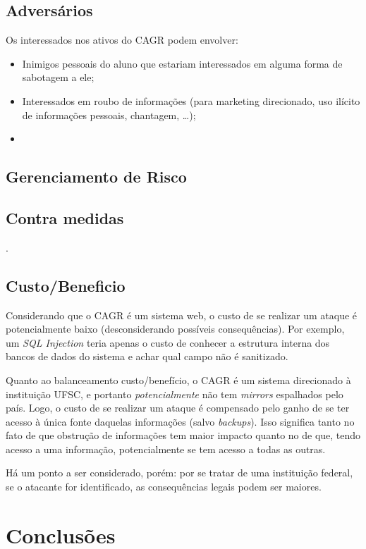 \documentclass{article}
\newcommand{\todo}[1]{{\color{red}{#1}}}
\begin{document}
    \subsection{Adversários}

    Os interessados nos ativos do CAGR podem envolver:

    \begin{itemize}
        \item Inimigos pessoais do aluno que estariam interessados em alguma
            forma de sabotagem a ele;
        \item Interessados em roubo de informações (para marketing direcionado,
            uso ilícito de informações pessoais, chantagem, \ldots);
        \item \todo{What else?}
    \end{itemize}

    \subsection{Gerenciamento de Risco}

    \todo{Ver sobre segurança do vBulletin}

    \subsection{Contra medidas}

    \todo{Ver se as contra-medidas são para quando já aconteceu o ataque ou se
    são medidas preventivas}.

    \subsection{Custo/Beneficio}

    Considerando que o CAGR é um sistema web, o custo de se realizar um ataque
    é potencialmente baixo (desconsiderando possíveis consequências). Por
    exemplo, um \textit{SQL Injection} teria apenas o custo de conhecer a
    estrutura interna dos bancos de dados do sistema e achar qual campo não é
    sanitizado.

    Quanto ao balanceamento custo/benefício, o CAGR é um sistema direcionado à
    instituição UFSC, e portanto \emph{potencialmente} não tem \textit{mirrors}
    espalhados pelo país. Logo, o custo de se realizar um ataque é compensado
    pelo ganho de se ter acesso à única fonte daquelas informações (salvo
    \textit{backups}). Isso significa tanto no fato de que obstrução de
    informações tem maior impacto quanto no de que, tendo acesso a uma
    informação, potencialmente se tem acesso a todas as outras.

    Há um ponto a ser considerado, porém: por se tratar de uma instituição
    federal, se o atacante for identificado, as consequências legais podem ser
    maiores.

    \section{Conclusões}

    \todo{TODO}
\end{document}
